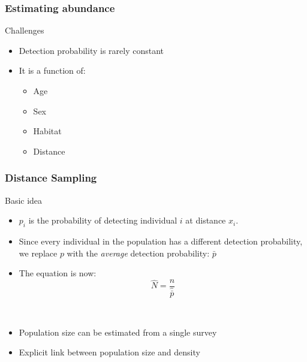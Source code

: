 \documentclass[color=usenames,dvipsnames]{beamer}\usepackage[]{graphicx}\usepackage[]{color}
\begin{document}
\begin{frame}
  \frametitle{Estimating abundance}
  \large
  {%
    Challenges}
  \begin{itemize}
    \item<1-> Detection probability is rarely constant
    \item<2-> It is a function of: %
    \begin{itemize}
      \large
      \item Age
      \item Sex
      \item Habitat
      \item \alert{Distance}
    \end{itemize}
  \end{itemize}

\end{frame}







\begin{frame}
  \frametitle{Distance Sampling}
  \large
  {%
    Basic idea} \\
  \begin{itemize}
  \item<1-> $p_i$ is the probability of detecting individual $i$ at
    distance $x_i$.
  \item<2-> Since every individual in the population has a different
    detection probability, we replace $p$ with the {\it average}
    detection probability: $\bar{p}$
  \item<3-> The equation is now: \\
    \[
      \hat{N} = \frac{n}{\hat{\bar{p}}}
    \]
  \end{itemize}
  \vspace{0.1cm}
   \\
    \begin{itemize}
      \item<5-> Population size can be estimated from a single survey
      \item<6-> Explicit link between population size and density
    \end{itemize}
\end{frame}
\end{document}
